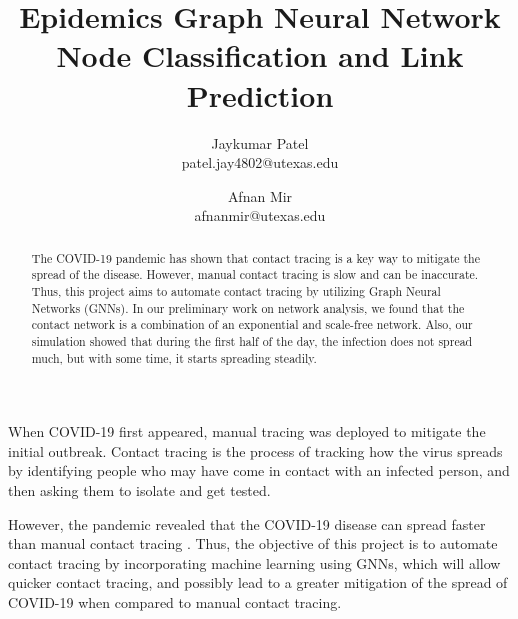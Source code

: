 \documentclass[times, 10pt,twocolumn]{article}
\begin{document}
\title{Epidemics Graph Neural Network Node Classification and Link Prediction}

\author{Jaykumar Patel\\
patel.jay4802@utexas.edu\\
\and
Afnan Mir\\
afnanmir@utexas.edu\\
}

\maketitle
\thispagestyle{empty}

\begin{abstract}
The COVID-19 pandemic has shown that contact tracing is a key way to mitigate the spread of the disease. However, manual contact tracing is slow and can be inaccurate. Thus, this project aims to automate contact tracing by utilizing Graph Neural Networks (GNNs). In our preliminary work on network analysis, we found that the contact network is a combination of an exponential and scale-free network. Also, our simulation showed that during the first half of the day, the infection does not spread much, but with some time, it starts spreading steadily. 
\end{abstract}



When COVID-19 first appeared, manual tracing was deployed to mitigate the initial outbreak. Contact tracing is the process of tracking how the virus spreads by identifying people who may have come in contact with an infected person, and then asking them to isolate and get tested.

However, the pandemic revealed that the COVID-19 disease can spread faster than manual contact tracing \cite{flaxman2020estimating}. Thus, the objective of this project is to automate contact tracing by incorporating machine learning using GNNs, which will allow quicker contact tracing, and possibly lead to a greater mitigation of the spread of COVID-19 when compared to manual contact tracing.

\end{document}
